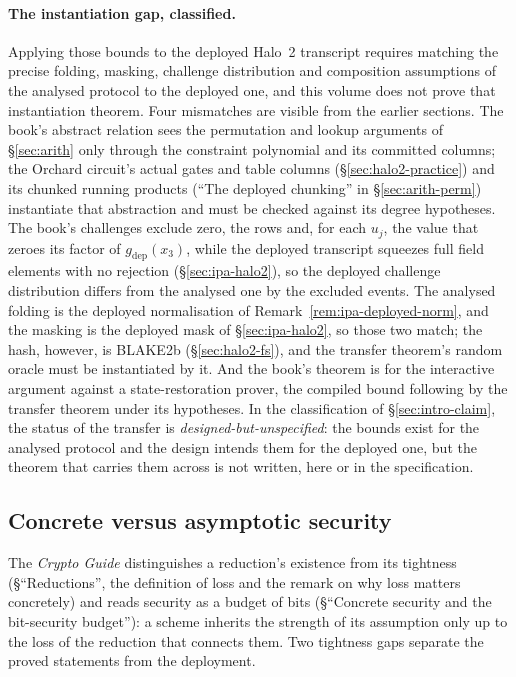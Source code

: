 \documentclass[11pt,a4paper]{article}
\theoremstyle{definition}
\begin{document}
\paragraph{The instantiation gap, classified.}
Applying those bounds to the deployed Halo~2 transcript requires
matching the precise folding, masking, challenge distribution and
composition assumptions of the analysed protocol to the deployed one,
and this volume does not prove that instantiation theorem. Four
mismatches are visible from the earlier sections. The book's abstract
relation sees the permutation and lookup arguments of \S\ref{sec:arith}
only through the constraint polynomial and its committed columns; the
Orchard circuit's actual gates and table columns
(\S\ref{sec:halo2-practice}) and its chunked running products (``The
deployed chunking'' in \S\ref{sec:arith-perm}) instantiate that
abstraction and must be checked against its degree hypotheses. The
book's challenges exclude zero, the rows and, for each $u_j$, the value
that zeroes its factor of $g_{\mathrm{dep}}(x_3)$, while the deployed
transcript squeezes full field elements with no rejection
(\S\ref{sec:ipa-halo2}), so the deployed challenge distribution differs
from the analysed one by the excluded events. The analysed folding is
the deployed normalisation of Remark~\ref{rem:ipa-deployed-norm}, and
the masking is the deployed mask of \S\ref{sec:ipa-halo2}, so those two
match; the hash, however, is BLAKE2b (\S\ref{sec:halo2-fs}), and the
transfer theorem's random oracle must be instantiated by it. And the
book's theorem is for the interactive argument against a
state-restoration prover, the compiled bound following by the transfer
theorem under its hypotheses. In the classification of
\S\ref{sec:intro-claim}, the status of the transfer is
\emph{designed-but-unspecified}: the bounds exist for the analysed
protocol and the design intends them for the deployed one, but the
theorem that carries them across is not written, here or in the
specification.

\subsection{Concrete versus asymptotic security}
\label{sec:ks-concrete}

The \emph{Crypto Guide} distinguishes a reduction's existence from its
tightness (\S``Reductions'', the definition of loss and the remark on
why loss matters concretely) and reads security as a budget of bits
(\S``Concrete security and the bit-security budget''): a scheme
inherits the strength of its assumption only up to the loss of the
reduction that connects them. Two tightness gaps separate the proved
statements from the deployment.
\end{document}

